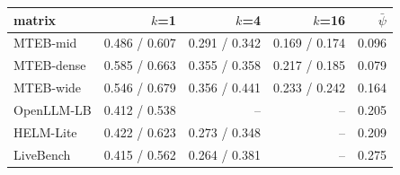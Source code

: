 \begin{tabular}{lrrrr}\toprule
matrix & $k$=1 & $k$=4 & $k$=16 & $\bar\psi$ \\\midrule
MTEB-mid & 0.486 / 0.607 & 0.291 / 0.342 & 0.169 / 0.174 & 0.096 \\
MTEB-dense & 0.585 / 0.663 & 0.355 / 0.358 & 0.217 / 0.185 & 0.079 \\
MTEB-wide & 0.546 / 0.679 & 0.356 / 0.441 & 0.233 / 0.242 & 0.164 \\
OpenLLM-LB & 0.412 / 0.538 & -- & -- & 0.205 \\
HELM-Lite & 0.422 / 0.623 & 0.273 / 0.348 & -- & 0.209 \\
LiveBench & 0.415 / 0.562 & 0.264 / 0.381 & -- & 0.275 \\
\bottomrule\end{tabular}
